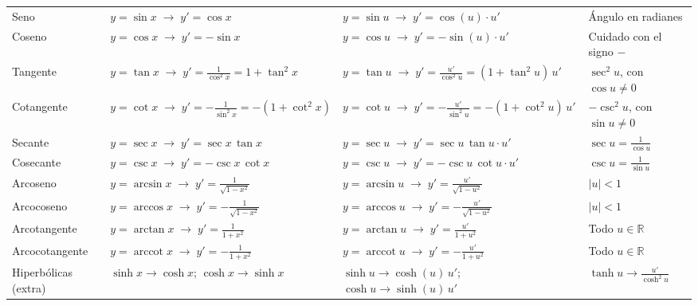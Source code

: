 \documentclass[10pt,a4paper]{article}
\begin{document}
\begin{center}
\begin{tabularx}{\linewidth}{@{}l >{\raggedright\arraybackslash}X >{\raggedright\arraybackslash}X l@{}}
\midrule
Seno & $y = \sin x \;\longrightarrow\; y' = \cos x$ & $y = \sin u \;\longrightarrow\; y' = \cos(u)\cdot u'$ & Ángulo en radianes \\
Coseno & $y = \cos x \;\longrightarrow\; y' = -\sin x$ & $y = \cos u \;\longrightarrow\; y' = -\sin(u)\cdot u'$ & Cuidado con el signo $-$ \\
Tangente & $\displaystyle y = \tan x \;\longrightarrow\; y' = \frac{1}{\cos^2 x} = 1+\tan^2 x$ & $\displaystyle y = \tan u \;\longrightarrow\; y' = \frac{u'}{\cos^2 u} = (1+\tan^2 u)\,u'$ & $\sec^2 u$, con $\cos u \neq 0$ \\
Cotangente & $\displaystyle y = \cot x \;\longrightarrow\; y' = -\frac{1}{\sin^2 x} = -(1+\cot^2 x)$ & $\displaystyle y = \cot u \;\longrightarrow\; y' = -\frac{u'}{\sin^2 u} = -(1+\cot^2 u)\,u'$ & $-\csc^2 u$, con $\sin u \neq 0$ \\
Secante & $y = \sec x \;\longrightarrow\; y' = \sec x\,\tan x$ & $y = \sec u \;\longrightarrow\; y' = \sec u\,\tan u \cdot u'$ & $\sec u = \frac{1}{\cos u}$ \\
Cosecante & $y = \csc x \;\longrightarrow\; y' = -\csc x\,\cot x$ & $y = \csc u \;\longrightarrow\; y' = -\csc u\,\cot u \cdot u'$ & $\csc u = \frac{1}{\sin u}$ \\
\midrule
Arcoseno & $\displaystyle y = \arcsin x \;\longrightarrow\; y' = \frac{1}{\sqrt{1 - x^2}}$ & $\displaystyle y = \arcsin u \;\longrightarrow\; y' = \frac{u'}{\sqrt{1 - u^2}}$ & $|u| < 1$ \\
Arcocoseno & $\displaystyle y = \arccos x \;\longrightarrow\; y' = -\frac{1}{\sqrt{1 - x^2}}$ & $\displaystyle y = \arccos u \;\longrightarrow\; y' = -\frac{u'}{\sqrt{1 - u^2}}$ & $|u| < 1$ \\
Arcotangente & $\displaystyle y = \arctan x \;\longrightarrow\; y' = \frac{1}{1 + x^2}$ & $\displaystyle y = \arctan u \;\longrightarrow\; y' = \frac{u'}{1 + u^2}$ & Todo $u \in \mathbb{R}$ \\
Arcocotangente & $\displaystyle y = \operatorname{arccot} x \;\longrightarrow\; y' = -\frac{1}{1 + x^2}$ & $\displaystyle y = \operatorname{arccot} u \;\longrightarrow\; y' = -\frac{u'}{1 + u^2}$ & Todo $u \in \mathbb{R}$ \\
\midrule
Hiperbólicas (extra) & $\sinh x \to \cosh x$; \; $\cosh x \to \sinh x$ & $\sinh u \to \cosh(u)\,u'$; \; $\cosh u \to \sinh(u)\,u'$ & $\tanh u \to \frac{u'}{\cosh^2 u}$ \\
\bottomrule
\end{tabularx}
\end{center}
\end{document}
